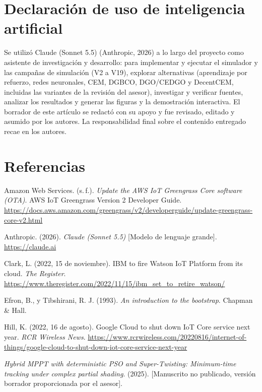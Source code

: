 \documentclass[letterpaper,11pt]{article}
\begin{document}
\section*{Declaración de uso de inteligencia artificial}
Se utilizó Claude (Sonnet 5.5) (Anthropic, 2026) a lo largo del proyecto como asistente de investigación y desarrollo: para implementar y ejecutar el simulador y las campañas de simulación (V2 a V19), explorar alternativas (aprendizaje por refuerzo, redes neuronales, CEM, DGBCO, DGO/CEDGO y DecentCEM, incluidas las variantes de la revisión del asesor), investigar y verificar fuentes, analizar los resultados y generar las figuras y la demostración interactiva. El borrador de este artículo se redactó con su apoyo y fue revisado, editado y asumido por los autores. La responsabilidad final sobre el contenido entregado recae en los autores.

\section*{Referencias}
\begingroup
{}\small\sloppy
\setlength{\parindent}{-1.27cm}\setlength{\leftskip}{1.27cm}\setlength{\parskip}{5pt}

\noindent\hspace*{-1.27cm}Amazon Web Services. (s.\,f.). \textit{Update the AWS IoT Greengrass Core software (OTA)}. AWS IoT Greengrass Version 2 Developer Guide. \url{https://docs.aws.amazon.com/greengrass/v2/developerguide/update-greengrass-core-v2.html}

Anthropic. (2026). \textit{Claude (Sonnet 5.5)} [Modelo de lenguaje grande]. \url{https://claude.ai}

Clark, L. (2022, 15 de noviembre). IBM to fire Watson IoT Platform from its cloud. \textit{The Register}. \url{https://www.theregister.com/2022/11/15/ibm_set_to_retire_watson/}

Efron, B., y Tibshirani, R. J. (1993). \textit{An introduction to the bootstrap}. Chapman \& Hall.

Hill, K. (2022, 16 de agosto). Google Cloud to shut down IoT Core service next year. \textit{RCR Wireless News}. \url{https://www.rcrwireless.com/20220816/internet-of-things/google-cloud-to-shut-down-iot-core-service-next-year}

\textit{Hybrid MPPT with deterministic PSO and Super-Twisting: Minimum-time tracking under complex partial shading}. (2025). [Manuscrito no publicado, versión borrador proporcionada por el asesor].
\end{document}
